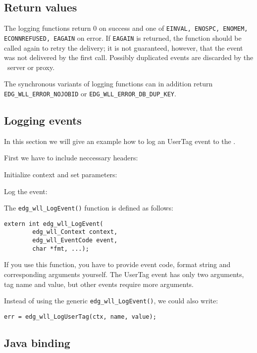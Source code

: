 \subsection{Return values}
The logging functions return 0 on success and one of \texttt{EINVAL,
ENOSPC, ENOMEM, ECONNREFUSED, EAGAIN} on error. If \texttt{EAGAIN} is
returned, the function should be called again to retry the delivery;
it is not guaranteed, however, that the event was not delivered by the
first call. Possibly duplicated events are discarded by the \LB\
server or proxy.

The synchronous variants of logging functions can in addition return
\verb'EDG_WLL_ERROR_NOJOBID' or \verb'EDG_WLL_ERROR_DB_DUP_KEY'.

\subsection{Logging events}
In this section we will give an example how to log an UserTag event to
the \LB.

First we have to include neccessary headers:


Initialize context and set parameters:




Log the event:


The \verb'edg_wll_LogEvent()' function is defined as follows:
\begin{lstlisting}[numbers=none]
extern int edg_wll_LogEvent(
        edg_wll_Context context,
        edg_wll_EventCode event,
        char *fmt, ...);
\end{lstlisting}
If you use this function, you have to provide event code, format
string and corresponding arguments yourself. The UserTag event has
only two arguments, tag name and value, but other events require more
arguments. 

Instead of using the generic \verb'edg_wll_LogEvent()', we could also
write:
\begin{lstlisting}[firstnumber=92]
err = edg_wll_LogUserTag(ctx, name, value);
\end{lstlisting}

\subsection{Java binding}

